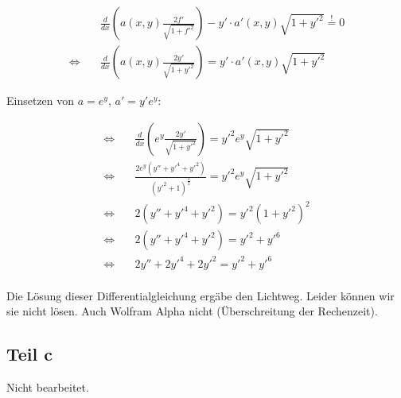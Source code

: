 \documentclass[a4paper,german,12pt,smallheadings]{scrartcl}
\begin{document}
\begin{align*}
  &\frac{d}{dx} \left(a(x,y) \frac{2f'}{\sqrt{1+f'^2}} \right) - y' \cdot a'(x, y) \sqrt{1+y'^2} \overset{!}{=} 0 \\
  \Leftrightarrow \quad &\frac{d}{dx} \left(a(x,y) \frac{2y'}{\sqrt{1+y'^2}} \right) = y' \cdot a'(x, y) \sqrt{1+y'^2}
\end{align*}

Einsetzen von $a = e^y$, $a' = y' e^y$:

\begin{align*}
  \Leftrightarrow \quad &\frac{d}{dx} \left(e^y \frac{2y'}{\sqrt{1+y'^2}} \right) = y'^2 e^y \sqrt{1+y'^2} \\
  \Leftrightarrow \quad &\frac{2e^y(y''+y'^4+y'^2)}{(y'^2+1)^\frac{3}{2}}= y'^2 e^y \sqrt{1+y'^2} \\
  \Leftrightarrow \quad &2(y''+y'^4+y'^2)= y'^2 (1+y'^2)^2\\
  \Leftrightarrow \quad &2(y''+y'^4+y'^2)= y'^2+y'^6\\
  \Leftrightarrow \quad &2y''+2y'^4+2y'^2= y'^2+y'^6\\
\end{align*}

Die Lösung dieser Differentialgleichung ergäbe den Lichtweg. Leider können wir
sie nicht lösen. Auch Wolfram Alpha nicht (Überschreitung der Rechenzeit).

\subsection*{Teil c}
Nicht bearbeitet.
\end{document}
